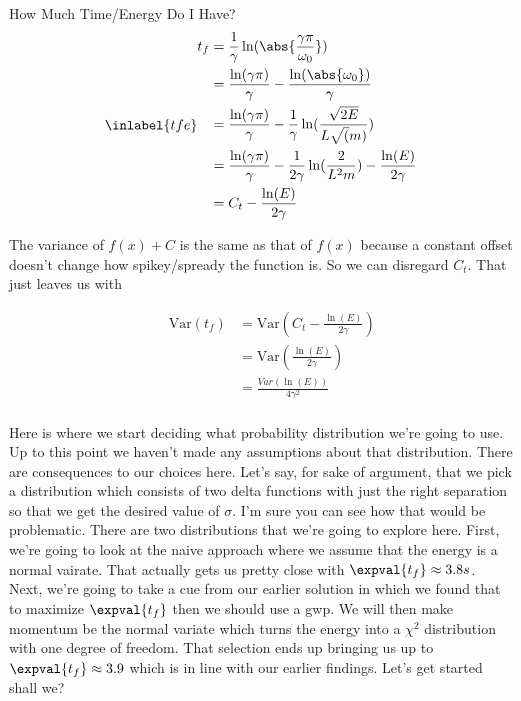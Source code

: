 \begin{answer}
\begin{answerpart}{How Much Time/Energy Do I Have?}
    \begin{equation}
      \inlabel{tfe}
      \begin{split}
        t_f
        &=
        \frac{1}{\gamma}
        \ln(\abs{\frac{\gamma\pi}{\omega_0}})
        \\
        &=
        \frac{\ln(\gamma\pi)}{\gamma}
        -
        \frac{\ln(\abs{\omega_0})}{\gamma}
        \\
        &=
        \frac{\ln(\gamma\pi)}{\gamma}
        -
        \frac{1}{\gamma}
        \ln(\frac{\sqrt{2E}}{L\sqrt(m)})
        \\
        &=
        \frac{\ln(\gamma\pi)}{\gamma}
        -
        \frac{1}{2\gamma}
        \ln(\frac{2}{L^2m})
        -
        \frac{\ln(E)}{2\gamma}
        \\
        &=
        C_t
        -
        \frac{\ln(E)}{2\gamma}
        \\
      \end{split}
    \end{equation}

    The variance of $f(x) + C$ is the same as that of $f(x)$ because a
    constant offset doesn't change how spikey/spready the function is.
    So we can disregard $C_t$.  That just leaves us with

    \begin{equation}
      \begin{alignedat}{2}
        &&\mathrm{Var}(t_f)
        &= \mathrm{Var}(C_t - \frac{\ln(E)}{2\gamma})\\
        &&&= \mathrm{Var}(\frac{\ln(E)}{2\gamma})\\
        &&&= \frac{Var(\ln(E))}{4\gamma^2}\\
      \end{alignedat}
    \end{equation}

    Here is where we start deciding what probability distribution
    we're going to use.  Up to this point we haven't made any
    assumptions about that distribution.  There are consequences to
    our choices here.  Let's say, for sake of argument, that we pick a
    distribution which consists of two delta functions with just the
    right separation so that we get the desired value of $\sigma$.
    I'm sure you can see how that would be problematic.  There are two
    distributions that we're going to explore here.  First, we're
    going to look at the naive approach where we assume that the
    energy is a normal vairate.  That actually gets us pretty close
    with $\expval{t_f} \approx 3.8s$.  Next, we're going to take a cue
    from our earlier solution in which we found that to maximize
    $\expval{t_f}$ then we should use a \ac{gwp}.  We will then make
    momentum be the normal variate which turns the energy into a
    $\chi^2$ distribution with one degree of freedom.  That selection
    ends up bringing us up to $\expval{t_f} \approx 3.9$ which is in
    line with our earlier findings.  Let's get started shall we?


\end{answerpart}
\end{answer}
